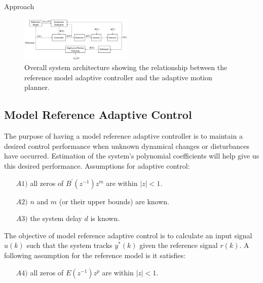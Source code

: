 
\begin{section}{Approach}
\label{sec:approach}


\begin{figure}
\vspace{1pt}
\centering
\includegraphics[width=0.48\textwidth]{sys_arch.png}
\caption{Overall system architecture showing the relationship between the reference model adaptive controller and the adaptive motion planner.}
\label{fig:system_arch}
\end{figure}

\subsection{Model Reference Adaptive Control}
The purpose of having a model reference adaptive controller is to maintain a desired control performance when unknown dynamical changes or disturbances have occurred. Estimation of the system's polynomial coefficients will help give us this desired performance.
Assumptions for adaptive control: 
	\begin{enumerate}[leftmargin=4\parindent]
	\item[$A1)$] all zeros of $B^{'}(z^{-1})z^m$ are within $|z|<1$. 
	\item[$A2)$] $n$ and $m$ (or their upper bounds) are known. 
	\item[$A3)$] the system delay $d$ is known.
	\end{enumerate}
The objective of model reference adaptive control is to calculate an input signal $u(k)$ such that the system tracks $y^{*}(k)$ given the reference signal $r(k)$. 
A following assumption for the reference model is it satisfies:
    \begin{enumerate}[leftmargin=4\parindent]
	\item[$A4)$] all zeros of $E(z^{-1})z^p$ are within $|z|<1$. 
	\end{enumerate}


\end{section}
